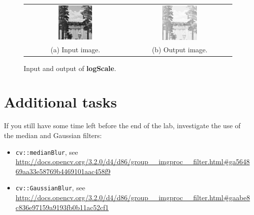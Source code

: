 \documentclass[english,a4paper,12pt,oneside]{article}
\begin{document}
        \begin {figure}[htb]
	\centering
	\begin{tabular}{cc}
		\includegraphics[width=0.35\textwidth]{lake}&
		\includegraphics[width=0.35\textwidth]{lake_log}\\
		(a) Input image. & (b) Output image.
	\end{tabular}
      \caption{\label{fig:logFilter}Input and output of \textbf{logScale}.}
    \end {figure}

    
\section{Additional tasks}

If you still have some time left before the end of the lab, investigate the use of the median and Gaussian filters:
\begin{itemize}
	\item \verb|cv::medianBlur|, see \url{http://docs.opencv.org/3.2.0/d4/d86/group__imgproc__filter.html#ga564869aa33e58769b4469101aac458f9} 
	\item \verb|cv::GaussianBlur|, see \url{http://docs.opencv.org/3.2.0/d4/d86/group__imgproc__filter.html#gaabe8c836e97159a9193fb0b11ac52cf1}
\end{itemize}


\end{document}
